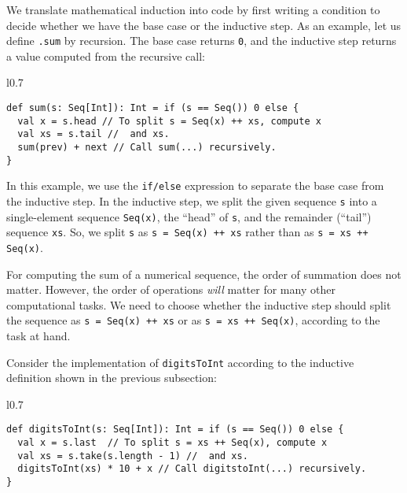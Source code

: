 We translate mathematical induction into code by first writing a condition
to decide whether we have the base case or the inductive step. As
an example, let us define \lstinline!.sum! by recursion. The base
case returns \lstinline!0!, and the inductive step returns a value
computed from the recursive call:

\begin{wrapfigure}{l}{0.7\columnwidth}%
\vspace{-0.85\baselineskip}
\begin{lstlisting}
def sum(s: Seq[Int]): Int = if (s == Seq()) 0 else {
  val x = s.head // To split s = Seq(x) ++ xs, compute x
  val xs = s.tail //  and xs.
  sum(prev) + next // Call sum(...) recursively.
}
\end{lstlisting}

\vspace{-1.5\baselineskip}
\end{wrapfigure}%

\noindent In this example, we use the \lstinline!if/else! expression
to separate the base case from the inductive step. In the inductive
step, we split the given sequence \lstinline!s! into a single-element
sequence \lstinline!Seq(x)!, the ``head'' of \lstinline!s!, and
the remainder (``tail'') sequence \lstinline!xs!. So, we split
\lstinline!s! as \lstinline!s = Seq(x) ++ xs! rather than as \lstinline!s = xs ++ Seq(x)!. 

For computing the sum of a numerical sequence, the order of summation
does not matter. However, the order of operations \emph{will} matter
for many other computational tasks. We need to choose whether the
inductive step should split the sequence as \lstinline!s = Seq(x) ++ xs!
or as \lstinline!s = xs ++ Seq(x)!, according to the task at hand.

Consider the implementation of \lstinline!digitsToInt! according
to the inductive definition shown in the previous subsection:

\begin{wrapfigure}{l}{0.7\columnwidth}%
\vspace{-0.85\baselineskip}
\begin{lstlisting}
def digitsToInt(s: Seq[Int]): Int = if (s == Seq()) 0 else {
  val x = s.last  // To split s = xs ++ Seq(x), compute x
  val xs = s.take(s.length - 1) //  and xs.
  digitsToInt(xs) * 10 + x // Call digitstoInt(...) recursively.
}
\end{lstlisting}

\vspace{-1.5\baselineskip}
\end{wrapfigure}%

